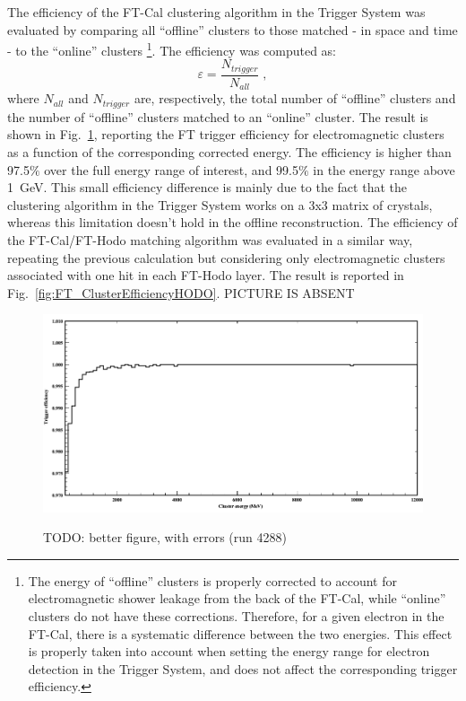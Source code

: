 The efficiency of the FT-Cal clustering algorithm in the Trigger System was evaluated by comparing all ``offline'' clusters to those matched - in space and time - to the ``online'' clusters \footnote{The energy of ``offline'' clusters is properly corrected to account for electromagnetic shower leakage from the back of the FT-Cal, while ``online'' clusters do not have these corrections. Therefore, for a given electron in the FT-Cal, there is a systematic difference between the two energies. This effect is properly taken into account when setting the energy range for electron detection in the Trigger System, and does not affect the corresponding trigger efficiency.}. The efficiency was computed as:
\begin{equation}
\varepsilon=\frac{N_{trigger}}{N_{all}} \; ,
\end{equation}
where $N_{all}$ and $N_{trigger}$ are, respectively, the total number of ``offline'' clusters and the number of ``offline'' clusters matched to an ``online'' cluster. The result is shown in Fig.~\ref{fig:FT_ClusterEfficiency}, reporting the FT trigger efficiency for electromagnetic clusters as a function of the corresponding corrected energy. The efficiency is higher than 97.5$\%$ over the full energy range of interest, and 99.5$\%$ in the energy range above 1~GeV. This small efficiency difference is mainly due to the fact that the clustering algorithm in the Trigger System works on a 3x3 matrix of crystals, whereas this limitation doesn't hold in the offline reconstruction.
The efficiency of the FT-Cal/FT-Hodo matching algorithm was evaluated in a similar way, repeating the previous calculation but considering only electromagnetic clusters associated with one hit in each FT-Hodo layer. The result is reported in Fig.~\ref{fig:FT_ClusterEfficiencyHODO}.
{\color{red} PICTURE IS ABSENT}

\begin{figure}[!htb]
 \centering
{\includegraphics[width=.5\textwidth]{img/FT_ClusterEfficiency.png}}
 \caption{TODO: better figure, with errors (run 4288)}
 \label{fig:FT_ClusterEfficiency}
\end{figure}



